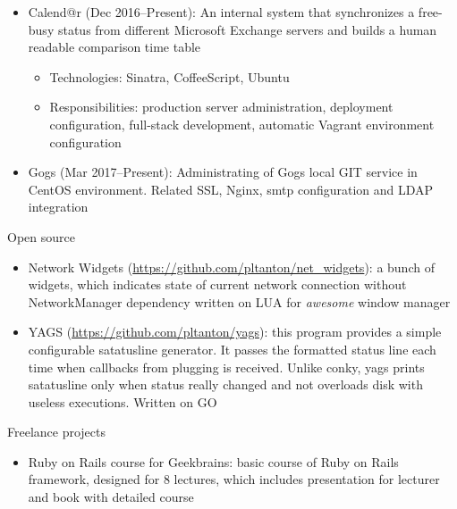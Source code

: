 \documentclass{cv}
\begin{document}
\begin{cvblock}{%
  }
\begin{itemize}
    \item Calend@r (Dec 2016--Present):
      An internal system that synchronizes a free-busy status from different
      Microsoft Exchange servers and builds a human readable comparison time
      table
      \begin{itemize}
        \item Technologies: Sinatra, CoffeeScript, Ubuntu
        \item Responsibilities: production server administration, deployment
          configuration, full-stack development, automatic Vagrant environment
          configuration
      \end{itemize}
    \item Gogs (Mar 2017--Present):
      Administrating of Gogs local GIT service in CentOS environment. Related
      SSL, Nginx, smtp configuration and LDAP integration

  \end{itemize}
\end{cvblock}

\vspace{2em}

\begin{cvblock}{Open source}
  \begin{itemize}
    \item Network Widgets
      (\url{https://github.com/pltanton/net_widgets}):
			a bunch of widgets, which indicates state of current network connection
      without NetworkManager dependency written on LUA for
      \textit{awesome} window manager
    \item YAGS
      (\url{https://github.com/pltanton/yags}):
      this program provides a simple configurable satatusline generator. It
      passes the formatted status line each time when callbacks from plugging
      is received. Unlike conky, yags prints satatusline only when status
      really changed and not overloads disk with useless executions. Written on
      GO

  \end{itemize}
\end{cvblock}

\vspace{2em}

\begin{cvblock}{Freelance projects}
  \begin{itemize}
    \item Ruby on Rails course for Geekbrains:
      basic course of Ruby on Rails framework, designed for 8 lectures, which
      includes presentation for lecturer and book with detailed course
  \end{itemize}
\end{cvblock}
\end{document}
